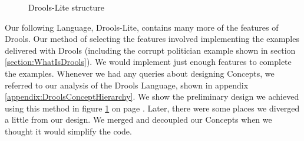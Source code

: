 \begin{figure}
    \centering
    \caption{Drools-Lite structure}
    \label{fig:DroolsLiteDiagram}
\end{figure}
 
Our following Language, Drools-Lite, contains many more of the features of Drools.
Our method of selecting the features involved implementing the examples delivered with Drools (including the corrupt politician example shown in section \ref{section:WhatIsDrools}).
We would implement just enough features to complete the examples.
Whenever we had any queries about designing Concepts, we referred to our analysis of the Drools Language, shown in appendix \ref{appendix:DroolsConceptHierarchy}.
We show the preliminary design we achieved using this method in figure \ref{fig:DroolsLiteDiagram} on page \pageref{fig:DroolsLiteDiagram}.
Later, there were some places we diverged a little from our design.
We merged and decoupled our Concepts when we thought it would simplify the code.

